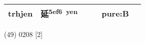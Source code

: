 \documentclass[14pt,a4paper]{scrartcl}
\begin{document}
\begin{longtable}[c]{@{}llllll@{}}
\begin{minipage}[t]{0.14\columnwidth}
trhjen
\strut\end{minipage} &
\begin{minipage}[t]{0.14\columnwidth}\raggedright\strut
延\textsuperscript{5ef6~yen}
\strut\end{minipage} &
\begin{minipage}[t]{0.14\columnwidth}\raggedright\strut
\strut\end{minipage} &
\begin{minipage}[t]{0.14\columnwidth}\raggedright\strut
\strut\end{minipage} &
\begin{minipage}[t]{0.14\columnwidth}\raggedright\strut
pure:B
\strut\end{minipage}\tabularnewline
\bottomrule
\end{longtable}

(49) 0208 {[}2{]}
\end{document}
